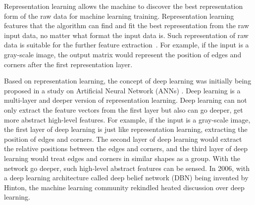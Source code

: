 \begin{spacing}{1.5}
Representation learning allows the machine to discover the best representation form of the raw data for machine learning training. Representation learning features that the algorithm can find and fit the best representation from the raw input data, no matter what format the input data is. Such representation of raw data is suitable for the further feature extraction~\cite{bengio2013representation}. For example, if the input is a gray-scale image, the output matrix would represent the position of edges and corners after the first representation layer.

Based on representation learning, the concept of deep learning was initially being proposed in a study on Artificial Neural Network (ANNs) \cite{hinton2006reducing}. Deep learning is a multi-layer and deeper version of representation learning. Deep learning can not only extract the feature vectors from the first layer but also can go deeper, get more abstract high-level features. For example, if the input is a gray-scale image, the first layer of deep learning is just like representation learning, extracting the position of edges and corners. The second layer of deep learning would extract the relative positions between the edges and corners, and the third layer of deep learning would treat edges and corners in similar shapes as a group. With the network go deeper, such high-level abstract features can be sensed. In 2006, with a deep learning architecture called deep belief network (DBN) \cite{hinton2006fast} being invented by Hinton, the machine learning community rekindled heated discussion over deep learning.


\end{spacing}
